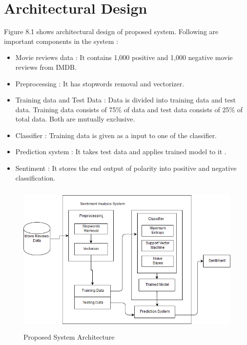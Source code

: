 \documentclass[oneside,a4paper,12pt]{pictreport}
\begin{document}
\section{Architectural Design}
Figure 8.1 shows architectural design of proposed system. Following are important components in the system :
\begin{itemize}
\item Movie reviews data : It contains 1,000 positive and 1,000 negative movie reviews from IMDB.
\item Preprocessing : It has stopwords removal and vectorizer.
\item Training data and Test Data : Data is divided into training data and test data. Training data consists of 75\%
of data and test data consists of 25\% of total data. Both are mutually exclusive.
\item Classifier : Training data is given as a input to one of the classifier.
\item Prediction system : It takes test data and applies trained model to it .
\item Sentiment : It stores the end output of polarity into positive and negative classification.   
\end{itemize}

\vspace{5mm}
\begin{figure}[!h]
\includegraphics[width=5.0in,height=3.0in]{archi.png}
\caption{Proposed System Architecture}
\end{figure}
\end{document}

